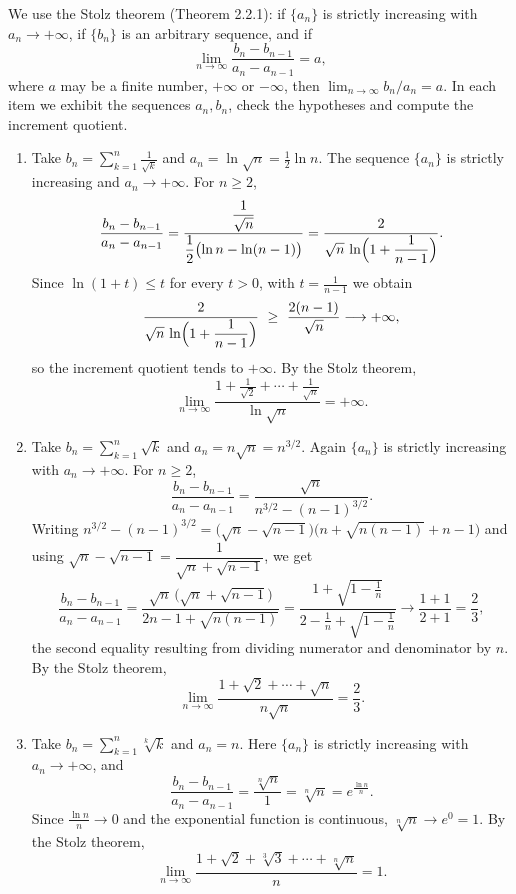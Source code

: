 \documentclass[11pt,a4paper]{article}
\newenvironment{solution}[1]{%
  \par\addvspace{1.7ex}%
  \noindent{\color{solutioncolor}\textbf{#1}}\hspace{0.55em}\ignorespaces}%
  {\par\addvspace{0.9ex}}
\begin{document}
\begin{solution}{Solution 2.2.3}\label{xs:2.2.3}
We use the Stolz theorem (Theorem 2.2.1): if $\{a_n\}$ is strictly increasing with $a_n\to+\infty$, if $\{b_n\}$ is an arbitrary sequence, and if
\[
\lim_{n\to\infty}\frac{b_n-b_{n-1}}{a_n-a_{n-1}}=a,
\]
where $a$ may be a finite number, $+\infty$ or $-\infty$, then $\lim_{n\to\infty}b_n/a_n=a$. In each item we exhibit the sequences $a_n,b_n$, check the hypotheses and compute the increment quotient.

\begin{enumerate}[(1)]
\item Take $b_n=\sum_{k=1}^{n}\frac{1}{\sqrt{k}}$ and $a_n=\ln\sqrt{n}=\frac12\ln n$. The sequence $\{a_n\}$ is strictly increasing and $a_n\to+\infty$. For $n\ge2$,
\[
\frac{b_n-b_{n-1}}{a_n-a_{n-1}}
=\frac{\dfrac{1}{\sqrt{n}}}{\dfrac12\bigl(\ln n-\ln(n-1)\bigr)}
=\frac{2}{\sqrt{n}\,\ln\Bigl(1+\dfrac{1}{n-1}\Bigr)} .
\]
Since $\ln(1+t)\le t$ for every $t>0$, with $t=\frac{1}{n-1}$ we obtain
\[
\frac{2}{\sqrt{n}\,\ln\Bigl(1+\dfrac{1}{n-1}\Bigr)}\ \ge\ \frac{2(n-1)}{\sqrt{n}}\longrightarrow+\infty ,
\]
so the increment quotient tends to $+\infty$. By the Stolz theorem,
\[
\lim_{n\to\infty}\frac{1+\frac{1}{\sqrt{2}}+\cdots+\frac{1}{\sqrt{n}}}{\ln\sqrt{n}}=+\infty .
\]

\item Take $b_n=\sum_{k=1}^{n}\sqrt{k}$ and $a_n=n\sqrt{n}=n^{3/2}$. Again $\{a_n\}$ is strictly increasing with $a_n\to+\infty$. For $n\ge2$,
\[
\frac{b_n-b_{n-1}}{a_n-a_{n-1}}=\frac{\sqrt{n}}{n^{3/2}-(n-1)^{3/2}} .
\]
Writing $n^{3/2}-(n-1)^{3/2}=\bigl(\sqrt{n}-\sqrt{n-1}\bigr)\bigl(n+\sqrt{n(n-1)}+n-1\bigr)$ and using
$\sqrt{n}-\sqrt{n-1}=\dfrac{1}{\sqrt{n}+\sqrt{n-1}}$, we get
\[
\frac{b_n-b_{n-1}}{a_n-a_{n-1}}
=\frac{\sqrt{n}\,\bigl(\sqrt{n}+\sqrt{n-1}\bigr)}{2n-1+\sqrt{n(n-1)}}
=\frac{1+\sqrt{1-\frac1n}}{2-\frac1n+\sqrt{1-\frac1n}}\longrightarrow\frac{1+1}{2+1}=\frac23,
\]
the second equality resulting from dividing numerator and denominator by $n$. By the Stolz theorem,
\[
\lim_{n\to\infty}\frac{1+\sqrt{2}+\cdots+\sqrt{n}}{n\sqrt{n}}=\frac23 .
\]

\item Take $b_n=\sum_{k=1}^{n}\sqrt[k]{k}$ and $a_n=n$. Here $\{a_n\}$ is strictly increasing with $a_n\to+\infty$, and
\[
\frac{b_n-b_{n-1}}{a_n-a_{n-1}}=\frac{\sqrt[n]{n}}{1}=\sqrt[n]{n}=e^{\frac{\ln n}{n}} .
\]
Since $\frac{\ln n}{n}\to0$ and the exponential function is continuous, $\sqrt[n]{n}\to e^{0}=1$. By the Stolz theorem,
\[
\lim_{n\to\infty}\frac{1+\sqrt{2}+\sqrt[3]{3}+\cdots+\sqrt[n]{n}}{n}=1 .
\]


\end{enumerate}
\end{solution}
\end{document}
